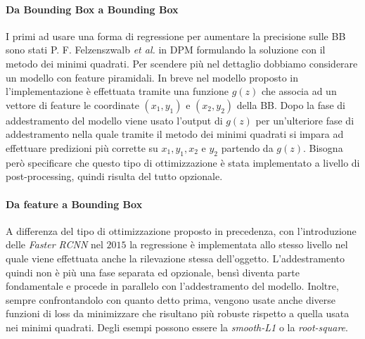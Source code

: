 \paragraph{Da Bounding Box a Bounding Box}
I primi ad usare una forma di regressione per aumentare la precisione sulle \ac{BB} sono stati P. F. Felzenszwalb \textit{et al.} in DPM \cite{5255236} formulando la soluzione con il metodo dei minimi quadrati. Per scendere più nel dettaglio dobbiamo considerare un modello con feature piramidali.
In breve nel modello proposto in \cite{5255236} l'implementazione è effettuata tramite una funzione $g(z)$ che associa ad un vettore di feature le coordinate $(x_1, y_1)$ e $(x_2, y_2)$ della \ac{BB}. Dopo la fase di addestramento del modello viene usato l'output di $g(z)$ per un'ulteriore fase di addestramento nella quale tramite il metodo dei minimi quadrati si impara ad effettuare predizioni più corrette su $x_1, y_1, x_2 \text{ e } y_2$ partendo da $g(z)$. Bisogna però specificare che questo tipo di ottimizzazione è stata implementato a livello di post-processing, quindi risulta del tutto opzionale.
\paragraph{Da feature a Bounding Box}
A differenza del tipo di ottimizzazione proposto in precedenza, con l'introduzione delle \textit{Faster RCNN} \cite{ren2015faster} nel $2015$ la regressione è implementata allo stesso livello nel quale viene effettuata anche la rilevazione stessa dell'oggetto. L'addestramento quindi non è più una fase separata ed opzionale, bensì diventa parte fondamentale e procede in parallelo con l'addestramento del modello.  Inoltre, sempre confrontandolo con quanto detto prima, vengono usate anche diverse funzioni di loss da minimizzare che risultano più robuste rispetto a quella usata nei minimi quadrati. Degli esempi possono essere la \textit{smooth-L1} o la \textit{root-square}.

